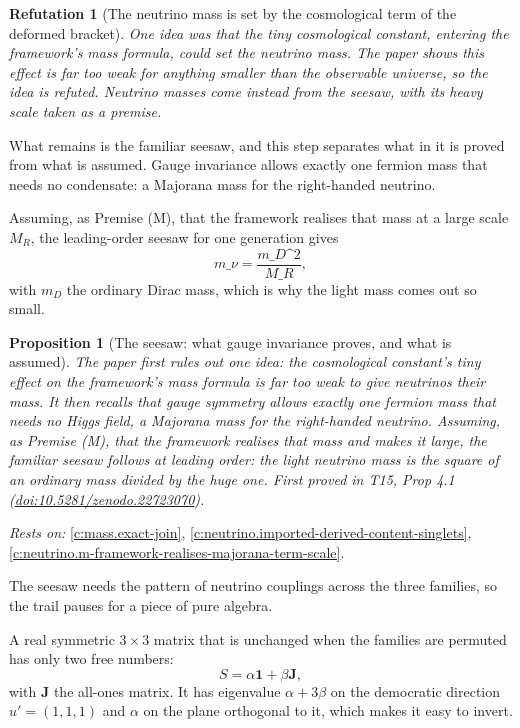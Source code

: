 \documentclass[11pt]{article}
\newtheorem{proposition}[theorem]{Proposition}
\newtheorem{refutation}[theorem]{Refutation}
\theoremstyle{definition}
\theoremstyle{plain}
\providecommand{\J}{}\renewcommand{\J}{\mathbf{J}}
\begin{document}
\begin{refutation}[The neutrino mass is set by the cosmological term of the deformed bracket]\label{c:refuted.the-neutrino-mass-is-set-by-the-cosmological-ter}
One idea was that the tiny cosmological constant, entering the framework's mass formula, could set the neutrino mass. The paper shows this effect is far too weak for anything smaller than the observable universe, so the idea is refuted. Neutrino masses come instead from the seesaw, with its heavy scale taken as a premise.
\end{refutation}

What remains is the familiar seesaw, and this step separates what in it is proved from what is assumed. Gauge invariance allows exactly one fermion mass that needs no condensate: a Majorana mass for the right-handed neutrino.

Assuming, as Premise (M), that the framework realises that mass at a large scale $M_{R}$, the leading-order seesaw for one generation gives \[ m\_{\nu} = \frac{m\_{D}\^{}{2}}{M\_{R}}, \] with $m_{D}$ the ordinary Dirac mass, which is why the light mass comes out so small.

\begin{proposition}[The seesaw: what gauge invariance proves, and what is assumed]\label{c:neutrino.seesaw-what-gauge-invariance-proves-what}
The paper first rules out one idea: the cosmological constant's tiny effect on the framework's mass formula is far too weak to give neutrinos their mass. It then recalls that gauge symmetry allows exactly one fermion mass that needs no Higgs field, a Majorana mass for the right-handed neutrino. Assuming, as Premise (M), that the framework realises that mass and makes it large, the familiar seesaw follows at leading order: the light neutrino mass is the square of an ordinary mass divided by the huge one.
\emph{First proved in} T15, Prop 4.1 (\href{https://doi.org/10.5281/zenodo.22723070}{doi:10.5281/zenodo.22723070}).
\end{proposition}
\noindent\emph{Rests on:} \ref{c:mass.exact-join}, \ref{c:neutrino.imported-derived-content-singlets}, \ref{c:neutrino.m-framework-realises-majorana-term-scale}.

The seesaw needs the pattern of neutrino couplings across the three families, so the trail pauses for a piece of pure algebra.

A real symmetric $3 \times 3$ matrix that is unchanged when the families are permuted has only two free numbers: \[ S = \alpha\mathbf{1} + \beta\J, \] with $\J$ the all-ones matrix. It has eigenvalue $\alpha + 3\beta$ on the democratic direction $u' = (1,1,1)$ and $\alpha$ on the plane orthogonal to it, which makes it easy to invert.
\end{document}
